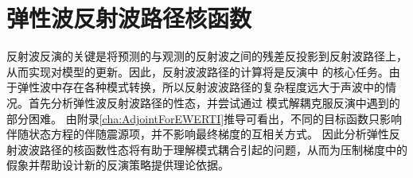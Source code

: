 \section{弹性波反射波路径核函数}
反射波反演的关键是将预测的与观测的反射波之间的残差反投影到反射波路径上，从而实现对模型的更新。因此，反射波波路径的计算将是反演中
的核心任务。由于弹性波中存在各种模式转换，所以反射波波路径的复杂程度远大于声波中的情况。首先分析弹性波反射波路径的性态，并尝试通过
模式解耦克服反演中遇到的部分困难。
由附录\ref{cha:AdjointForEWERTI}推导可看出，不同的目标函数只影响伴随状态方程的伴随震源项，并不影响最终梯度的互相关方式。
因此分析弹性反射波波路径的核函数性态将有助于理解模式耦合引起的问题，从而为压制梯度中的假象并帮助设计新的反演策略提供理论依据。
\begin{figure}[!htb]
   \centering
   \\

\end{figure}
